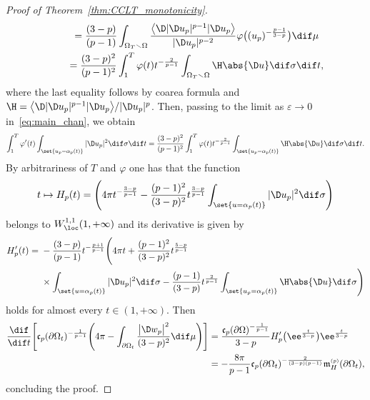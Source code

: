 \documentclass[10pt,a4paper]{amsart}
\numberwithin{equation}{section}
\renewcommand{\ncapa}{\mathfrak{c}}
\newcommand{\ma}{\mathfrak{m}}
\newcommand{\tp}[1][p]{{\text{\tiny$(#1)$}}}
\begin{document}
\begin{proof}[Proof of Theorem~\ref{thm:CCLT_monotonicity}]
\begin{gather*}
 \qquad {}=
 \frac{(3-p)}{(p-1)} \int_{\Omega_T \smallsetminus \Omega} \frac{ \big\langle \D | \D u_p |^{p-1} | \D u_p\big\rangle}{| \D u_p |^{p-2}} \varphi \big((u_p)^{-\frac{p-1}{3-p}}\big)\dif \mu \\
 \qquad {}=
 \frac{(3-p)^2}{(p-1)^2}\int_1^{T}\varphi(t) t^{-\frac{2}{p-1}} \int_{\Omega_T \smallsetminus \Omega} \H \abs{ \D u} \dif \sigma \dif t,
\end{gather*}
where the last equality follows by coarea formula and $\H= \big\langle\D | \D u_p |^{p-1} | \D u_p\big\rangle / | \D u_p |^p$. Then, passing to the limit as $\varepsilon \to 0$ in~\eqref{eq:main_chan}, we obtain
\[
 \int_1^{T} \varphi'(t) \int_{\set{u_p=\alpha_p(t)}} | \D u_p |^2 \dif \sigma \dif t =
 \frac{(3-p)^2}{(p-1)^2}\int_1^{T}\varphi(t) t^{-\frac{2}{p-1} } \int_{\set{u_p= \alpha_p(t)}} \H \abs{ \D u} \dif \sigma \dif t.
\]
By arbitrariness of $T$ and $\varphi$ one has that the function
\[
 t \mapsto H_p(t)=\Bigg(4 \pi t^{-\frac{3-p}{p-1}}-\frac{(p-1)^2}{(3-p)^2}t^{\frac{3-p}{p-1}} \int_{\set{u=\alpha_p(t)}} |\D u_p |^2 \dif \sigma\Bigg)
\]
belongs to $W^{1,1}_{\loc}(1,+\infty)$ and its derivative is given by
\begin{align*}
H'_p(t)={}& -\frac{(3-p)}{(p-1)}t^{-\frac{p+1}{p-1}}\Bigg(4 \pi t+ \frac{(p-1)^2}{(3-p)^2} t^{\frac{5-p}{p-1}} \\
&{}\times \int_{\set{u=\alpha_p(t)}} |\D u_p |^2 \dif \sigma - \frac{(p-1)}{(3-p)} t^{\frac{2}{p-1}}\int_{\set{u_p= \alpha_p(t)}} \H \abs{ \D u} \dif \sigma\Bigg)
\end{align*}
holds for almost every $t \in (1,+\infty)$. Then
\begin{align*}
 \frac{\dif}{\dif t}\Bigg[\ncapa_p(\partial \Omega_t)^{-\frac{1}{p-1}}\Bigg( 4 \pi - \int_{\partial \Omega_t} \frac{\big|\D w_p\big|^2}{(3-p)^2}\dif \mu\Bigg)\Bigg] &{}= \frac{\ncapa_p(\partial \Omega)^{-\frac{1}{p-1}}}{3-p} H'_p\big(\ee^{\frac{t}{3-p}}\big) \ee^{\frac{t}{3-p}}\\
 &{}=- \frac{8\pi}{p-1}\ncapa_p(\partial \Omega_t)^{-\frac{2}{(3-p)(p-1)}}\ma_{H}^{\tp}(\partial \Omega_t),
\end{align*}
concluding the proof.\end{proof}
\end{document}
